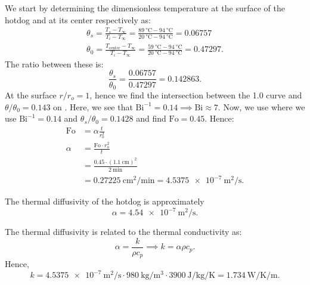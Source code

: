 \begin{derivation}
  \derivationpart
  We start by determining the dimensionless temperature at the surface of the hotdog and at its center respectively as:
  \begin{gather*}
    \theta_s = \frac{T_{s} - T_{\infty}}{T_i - T_{\infty}} = \frac{\qty{89}{\celsius} - \qty{94}{\celsius}}{\qty{20}{\celsius} - \qty{94}{\celsius} } = \num{0.06757} \\
    \theta_0 = \frac{T_{\text{center}} - T_{\infty}}{T_i - T_{\infty}} = \frac{\qty{59}{\celsius} - \qty{94}{\celsius}}{\qty{20}{\celsius} - \qty{94}{\celsius} } = \num{0.47297}
  .\end{gather*}
  The ratio between these is:
  \begin{equation*}
    \frac{\theta_s}{\theta_0} = \frac{\num{0,06757}}{\num{0,47297} } = \num{0.142863}
  .\end{equation*}
  At the surface $r / r_o = 1$, hence we find the intersection between the \num{1,0} curve and $\theta / \theta_0 = \num{0,143}$ on .
  Here, we see that $\mathrm{Bi}^{-1} = \num{0,14} \implies \mathrm{Bi} \approx \num{7}$.
  Now, we use  where we use $\mathrm{Bi}^{-1} = \num{0,14}$ and $\theta_s / \theta_0 = \num{0,1428}$ and find $\mathrm{Fo} = \num{0,45}$.
  Hence:
  \begin{align*}
    \mathrm{Fo} &= \alpha \frac{t}{r_o^2} \\
    \alpha &= \frac{\mathrm{Fo} \cdot r_o^2}{t} \\
    &= \frac{\num{0,45} \cdot (\qty{1,1}{\cm})^2}{\qty{2}{\minute} }  \\
    &= \qty{0.27225}{\centi\meter^2\per\minute} = \qty{4.5375e-7}{\meter\squared\per\second}
  .\end{align*}

  \begin{subresult}
    The thermal diffusivity of the hotdog is approximately
    \begin{equation*}
      \alpha = \qty{4.54e-7}{\meter\squared\per\second}
    .\end{equation*}
  \end{subresult}

  \derivationpart

  The thermal diffusivity is related to the thermal conductivity as:
  \begin{equation*}
    \alpha = \frac{k}{\rho c_p} \implies k = \alpha \rho c_p
  .\end{equation*}
  Hence,
  \begin{equation*}
    k = \qty{4,5375e-7}{\m\squared\per\second} \cdot \qty{980}{\kg\per\m\cubed} \cdot \qty{3900}{\J\per\kg\per\K}  = \qty{1.734}{\W\per\kelvin\per\meter}
  .\end{equation*}
  

\end{derivation}
